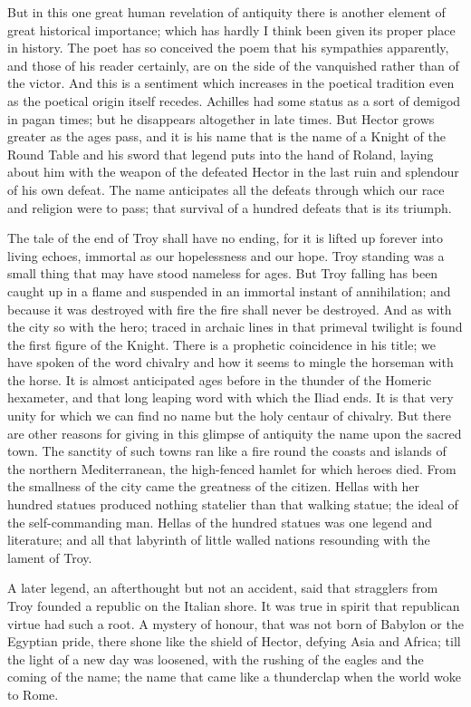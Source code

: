 But in this one great human revelation of antiquity there is another element of great historical importance; which has hardly I think been given its proper place in history. The poet has so conceived the poem that his sympathies apparently, and those of his reader certainly, are on the side of the vanquished rather than of the victor. And this is a sentiment which increases in the poetical tradition even as the poetical origin itself recedes. Achilles had some status as a sort of demigod in pagan times; but he disappears altogether in late times. But Hector grows greater as the ages pass, and it is his name that is the name of a Knight of the Round Table and his sword that legend puts into the hand of Roland, laying about him with the weapon of the defeated Hector in the last ruin and splendour of his own defeat. The name anticipates all the defeats through which our race and religion were to pass; that survival of a hundred defeats that is its triumph.

The tale of the end of Troy shall have no ending, for it is lifted up forever into living echoes, immortal as our hopelessness and our hope. Troy standing was a small thing that may have stood nameless for ages. But Troy falling has been caught up in a flame and suspended in an immortal instant of annihilation; and because it was destroyed with fire the fire shall never be destroyed. And as with the city so with the hero; traced in archaic lines in that primeval twilight is found the first figure of the Knight. There is a prophetic coincidence in his title; we have spoken of the word chivalry and how it seems to mingle the horseman with the horse. It is almost anticipated ages before in the thunder of the Homeric hexameter, and that long leaping word with which the Iliad ends. It is that very unity for which we can find no name but the holy centaur of chivalry. But there are other reasons for giving in this glimpse of antiquity the name upon the sacred town. The sanctity of such towns ran like a fire round the coasts and islands of the northern Mediterranean, the high-fenced hamlet for which heroes died. From the smallness of the city came the greatness of the citizen. Hellas with her hundred statues produced nothing statelier than that walking statue; the ideal of the self-commanding man. Hellas of the hundred statues was one legend and literature; and all that labyrinth of little walled nations resounding with the lament of Troy.

A later legend, an afterthought but not an accident, said that stragglers from Troy founded a republic on the Italian shore. It was true in spirit that republican virtue had such a root. A mystery of honour, that was not born of Babylon or the Egyptian pride, there shone like the shield of Hector, defying Asia and Africa; till the light of a new day was loosened, with the rushing of the eagles and the coming of the name; the name that came like a thunderclap when the world woke to Rome.

